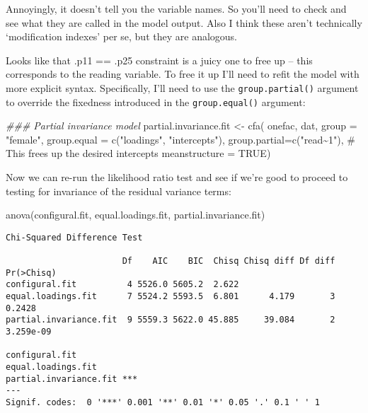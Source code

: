 \documentclass[
  letterpaper,
  DIV=11,
  numbers=noendperiod]{scrreprt}
\newenvironment{Shaded}{\begin{snugshade}}{\end{snugshade}}
\newcommand{\AttributeTok}[1]{\textcolor[rgb]{0.40,0.45,0.13}{#1}}
\newcommand{\CommentTok}[1]{\textcolor[rgb]{0.37,0.37,0.37}{#1}}
\newcommand{\ConstantTok}[1]{\textcolor[rgb]{0.56,0.35,0.01}{#1}}
\newcommand{\DocumentationTok}[1]{\textcolor[rgb]{0.37,0.37,0.37}{\textit{#1}}}
\newcommand{\FunctionTok}[1]{\textcolor[rgb]{0.28,0.35,0.67}{#1}}
\newcommand{\NormalTok}[1]{\textcolor[rgb]{0.00,0.23,0.31}{#1}}
\newcommand{\OtherTok}[1]{\textcolor[rgb]{0.00,0.23,0.31}{#1}}
\newcommand{\StringTok}[1]{\textcolor[rgb]{0.13,0.47,0.30}{#1}}
\begin{document}
Annoyingly, it doesn't tell you the variable names. So you'll need to
check and see what they are called in the model output. Also I think
these aren't technically `modification indexes' per se, but they are
analogous.

Looks like that .p11 == .p25 constraint is a juicy one to free up --
this corresponds to the reading variable. To free it up I'll need to
refit the model with more explicit syntax. Specifically, I'll need to
use the \texttt{group.partial()} argument to override the fixedness
introduced in the \texttt{group.equal()} argument:

\begin{Shaded}
\begin{Highlighting}[]
\DocumentationTok{\#\#\# Partial invariance model}
\NormalTok{partial.invariance.fit }\OtherTok{\textless{}{-}} \FunctionTok{cfa}\NormalTok{(}
\NormalTok{  onefac, }
\NormalTok{  dat, }
  \AttributeTok{group =} \StringTok{"female"}\NormalTok{, }
  \AttributeTok{group.equal =} \FunctionTok{c}\NormalTok{(}\StringTok{"loadings"}\NormalTok{, }\StringTok{"intercepts"}\NormalTok{), }
  \AttributeTok{group.partial=}\FunctionTok{c}\NormalTok{(}\StringTok{"read\textasciitilde{}1"}\NormalTok{), }\CommentTok{\# This frees up the desired intercepts}
  \AttributeTok{meanstructure =} \ConstantTok{TRUE}\NormalTok{)}
\end{Highlighting}
\end{Shaded}

Now we can re-run the likelihood ratio test and see if we're good to
proceed to testing for invariance of the residual variance terms:

\begin{Shaded}
\begin{Highlighting}[]
\FunctionTok{anova}\NormalTok{(configural.fit, equal.loadings.fit, partial.invariance.fit)}
\end{Highlighting}
\end{Shaded}

\begin{verbatim}
Chi-Squared Difference Test

                       Df    AIC    BIC  Chisq Chisq diff Df diff Pr(>Chisq)
configural.fit          4 5526.0 5605.2  2.622                              
equal.loadings.fit      7 5524.2 5593.5  6.801      4.179       3     0.2428
partial.invariance.fit  9 5559.3 5622.0 45.885     39.084       2  3.259e-09
                          
configural.fit            
equal.loadings.fit        
partial.invariance.fit ***
---
Signif. codes:  0 '***' 0.001 '**' 0.01 '*' 0.05 '.' 0.1 ' ' 1
\end{verbatim}
\end{document}
